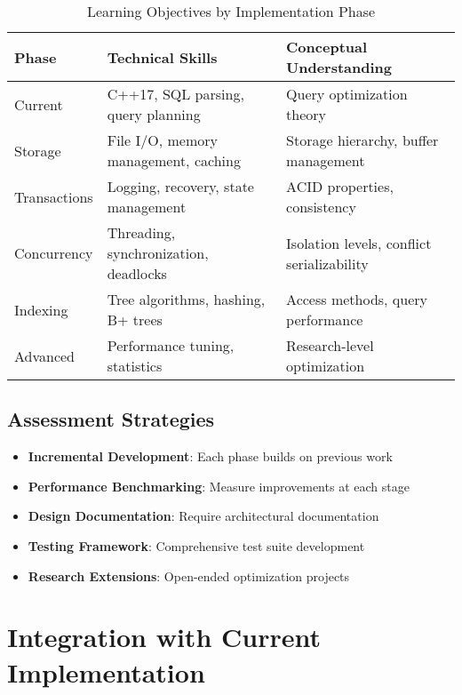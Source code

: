\documentclass[12pt,a4paper]{article}
\begin{document}
    \begin{table}[htbp]
        \centering
        \caption{Learning Objectives by Implementation Phase}
        \label{tab:learning}
        \begin{tabular}{p{2cm}p{5cm}p{5cm}}
            \toprule
            \textbf{Phase} & \textbf{Technical Skills} & \textbf{Conceptual Understanding} \\
            \midrule
            Current & C++17, SQL parsing, query planning & Query optimization theory \\
            Storage & File I/O, memory management, caching & Storage hierarchy, buffer management \\
            Transactions & Logging, recovery, state management & ACID properties, consistency \\
            Concurrency & Threading, synchronization, deadlocks & Isolation levels, conflict serializability \\
            Indexing & Tree algorithms, hashing, B+ trees & Access methods, query performance \\
            Advanced & Performance tuning, statistics & Research-level optimization \\
            \bottomrule
        \end{tabular}
    \end{table}

    \subsection{Assessment Strategies}

    \begin{itemize}
        \item \textbf{Incremental Development}: Each phase builds on previous work
        \item \textbf{Performance Benchmarking}: Measure improvements at each stage
        \item \textbf{Design Documentation}: Require architectural documentation
        \item \textbf{Testing Framework}: Comprehensive test suite development
        \item \textbf{Research Extensions}: Open-ended optimization projects
    \end{itemize}

    \section{Integration with Current Implementation}
\end{document}
